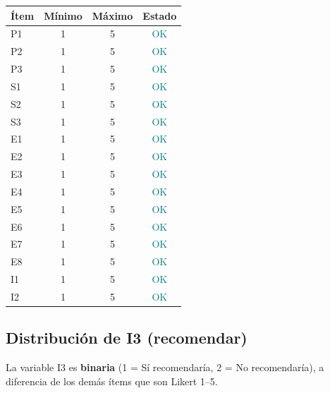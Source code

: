 \documentclass[
  spanish,
]{article}
\begin{document}
\begin{table}[!h]
\centering
\begin{tabular}{lcc>{}c}
\toprule
Ítem & Mínimo & Máximo & Estado\\
\midrule
P1 & 1 & 5 & \textcolor{teal}{OK}\\
P2 & 1 & 5 & \textcolor{teal}{OK}\\
P3 & 1 & 5 & \textcolor{teal}{OK}\\
S1 & 1 & 5 & \textcolor{teal}{OK}\\
S2 & 1 & 5 & \textcolor{teal}{OK}\\
\addlinespace
S3 & 1 & 5 & \textcolor{teal}{OK}\\
E1 & 1 & 5 & \textcolor{teal}{OK}\\
E2 & 1 & 5 & \textcolor{teal}{OK}\\
E3 & 1 & 5 & \textcolor{teal}{OK}\\
E4 & 1 & 5 & \textcolor{teal}{OK}\\
\addlinespace
E5 & 1 & 5 & \textcolor{teal}{OK}\\
E6 & 1 & 5 & \textcolor{teal}{OK}\\
E7 & 1 & 5 & \textcolor{teal}{OK}\\
E8 & 1 & 5 & \textcolor{teal}{OK}\\
I1 & 1 & 5 & \textcolor{teal}{OK}\\
\addlinespace
I2 & 1 & 5 & \textcolor{teal}{OK}\\
\bottomrule
\end{tabular}
\end{table}

\subsection{Distribución de I3
(recomendar)}\label{distribuciuxf3n-de-i3-recomendar}

La variable I3 es \textbf{binaria} (1 = Sí recomendaría, 2 = No
recomendaría), a diferencia de los demás ítems que son Likert 1--5.
\end{document}
